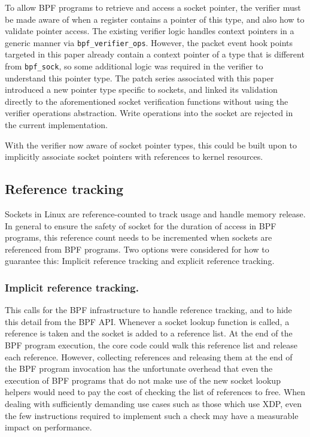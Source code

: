\documentclass[10pt,sigconf,authorversion]{lpc}
\begin{document}
To allow BPF programs to retrieve and access a socket pointer, the verifier
must be made aware of when a register contains a pointer of this type, and also
how to validate pointer access. The existing verifier logic handles context
pointers in a generic manner via \verb+bpf_verifier_ops+. However, the packet
event hook points targeted in this paper already contain a context pointer of a
type that is different from \verb+bpf_sock+, so some additional logic was
required in the verifier to understand this pointer type. The patch series
associated with this paper introduced a new pointer type specific to sockets,
and linked its validation directly to the aforementioned socket verification
functions without using the verifier operations abstraction. Write operations
into the socket are rejected in the current implementation.

With the verifier now aware of socket pointer types, this could be built upon
to implicitly associate socket pointers with references to kernel resources.

\subsection{Reference tracking}

Sockets in Linux are reference-counted to track usage and handle memory
release. In general to ensure the safety of socket for the duration of access
in BPF programs, this reference count needs to be incremented when sockets are
referenced from BPF programs. Two options were considered for how to guarantee
this: Implicit reference tracking and explicit reference tracking.

\subsubsection{Implicit reference tracking.}

This calls for the BPF infrastructure to handle reference tracking, and to hide
this detail from the BPF API. Whenever a socket lookup function is called, a
reference is taken and the socket is added to a reference list. At the end of
the BPF program execution, the core code could walk this reference list and
release each reference. However, collecting references and releasing them at
the end of the BPF program invocation has the unfortunate overhead that even
the execution of BPF programs that do not make use of the new socket lookup
helpers would need to pay the cost of checking the list of references to free.
When dealing with sufficiently demanding use cases such as those which use XDP,
even the few instructions required to implement such a check may have a
measurable impact on performance.
\end{document}
